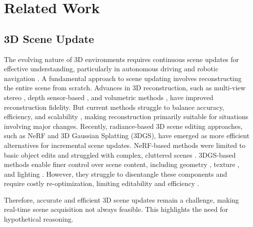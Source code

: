 \section{Related Work}
\subsection{3D Scene Update} 

The evolving nature of 3D environments requires continuous scene updates for effective understanding, particularly in autonomous driving \cite{yurtsever2020survey} and robotic navigation \cite{wong2000scene}. A fundamental approach to scene updating involves reconstructing the entire scene from scratch. Advances in 3D reconstruction, such as multi-view stereo \cite{seitz2006comparison}, depth sensor-based \cite{zollhofer2014real}, and volumetric methods \cite{newcombe2011kinectfusion}, have improved reconstruction fidelity. But current methods struggle to balance accuracy, efficiency, and scalability \cite{niessner2013real}, making reconstruction primarily suitable for situations involving major changes. Recently, radiance-based 3D scene editing approaches, such as NeRF and 3D Gaussian Splatting (3DGS), have emerged as more efficient alternatives for incremental scene updates. NeRF-based methods \cite{liu2021editing,kania2022conerf} were limited to basic object edits and struggled with complex, cluttered scenes \cite{ye2025gaussian}. 3DGS-based methods enable finer control over scene content, including geometry \cite{huang2024sc,waczynska2024games,ye2025gaussian}, texture \cite{chen2024gaussianeditor}, and lighting \cite{gao2025relightable}. However, they struggle to disentangle these components and require costly re-optimization, limiting editability and efficiency \cite{wu2024recent}. 

Therefore, accurate and efficient 3D scene updates remain a challenge, making real-time scene acquisition not always feasible. This highlights the need for hypothetical reasoning.

